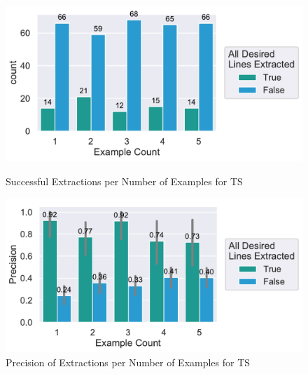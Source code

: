 \documentclass[\myrootdir/main.tex]{subfiles}
\begin{document}
\begin{figure}[htbp]
	\centering
	\begin{minipage}{0.45\textwidth}
		\centering
		\includegraphics[width=\textwidth, clip]{img/big-study/success-examples-TS.pdf}
		\caption{Successful Extractions per Number of Examples for TS}
		\label{fig:success-examples-ts}
	\end{minipage}\hfill
	\begin{minipage}{0.45\textwidth}
		\centering
		\includegraphics[width=\textwidth, clip]{img/big-study/precision-TS.pdf}
		\caption{Precision of Extractions per Number of Examples for TS}
		\label{fig:precision-ts}
	\end{minipage}
\end{figure}
\end{document}
